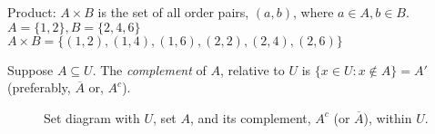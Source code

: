 \documentclass{article}
\def \subheaderSpace {10pt}
\begin{document}
        \vspace{\subheaderSpace}

        \begin{definition}
            Product: $A\times B$ is the set of all order pairs, $(a,b)$, where $a\in A, b\in B$. \\
            $A = \{1,2\}, B = \{2,4,6\}$ $A\times B = \{(1,2),(1,4),(1,6),(2,2),(2,4),(2,6)\}$
        \end{definition}

        \vspace{\subheaderSpace}

        \begin{definition}
            Suppose $A\subseteq U$. The \textit{complement} of $A$, relative to $U$ is $\{x\in U\colon x\notin A\} = A'$ (preferably, $\overline{A}$ or, $A^c$).
        \end{definition}

        \begin{figure}[htbp]
            \centering
            \caption{Set diagram with $U$, set $A$, and its complement, $A^c$ (or $\overline{A}$), within $U$.}
        \end{figure}

\newpage

\end{document}
